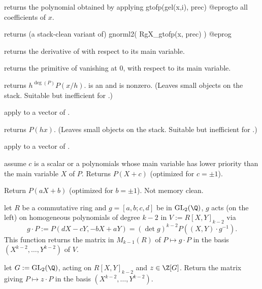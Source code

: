 
 returns the polynomial obtained by
applying
\bprog
  gtofp(gel(x,i), prec)
@eprog\noindent to all coefficients of $x$.

 returns (a stack-clean variant of)
\bprog
  gnorml2( RgX_gtofp(x, prec) )
@eprog

 returns the derivative of  with respect to
its main variable.

 returns the primitive of  vanishing at
$0$, with respect to its main variable.

 returns $h^{\deg(P)} P(x/h)$.
 is an  and  is nonzero. (Leaves small objects on the
stack. Suitable but inefficient for .)

 apply  to a vector
of .

 returns $P(h x)$. (Leaves small objects
on the stack. Suitable but inefficient for .)

 apply  to a vector
of .

 assume $c$ is a scalar or
a polynomials whose main variable has lower priority than the main variable
$X$ of $P$. Returns $P(X + c)$ (optimized for $c = \pm 1$).

 Return $P(aX + b)$
(optimized for $b = \pm 1$). Not memory clean.


 let $R$ be a commutative ring
and $g = [a,b;c,d]$ be in $\text{GL}_2(\Q)$, $g$ acts (on the left)
on homogeneous polynomials of degree $k-2$ in $V := R[X,Y]_{k-2}$ via
$$ g\cdot P := P(dX-cY, -bX+aY) = (\det g)^{k-2} P((X,Y)\cdot g^{-1}).$$
This function returns the matrix in $M_{k-1}(R)$ of $P\mapsto g\cdot P$ in
the basis $(X^{k-2},\dots,Y^{k-2})$ of $V$.

 let $G:=\text{GL}_2(\Q)$, acting
on $R[X,Y]_{k-2}$ and $z\in \Z[G]$. Return the matrix giving
$P\mapsto z\cdot P$ in the basis $(X^{k-2},\dots,Y^{k-2})$.


